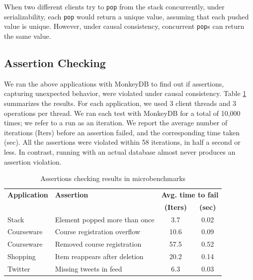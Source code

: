 When two different clients try to \texttt{pop} from the stack concurrently, 
under serializability, each \texttt{pop} would return a unique value, assuming that each pushed value is
unique. However, under causal consistency, concurrent \texttt{pop}s can return the same
value.

	

\subsection{Assertion Checking}
\label{sec:micro-assertion-violations}

We ran the above applications with MonkeyDB to find out if assertions, capturing
unexpected behavior, were violated under causal consistency. Table
\ref{tab:assert} summarizes the results. For each application, 
we used 3 client threads and 3 operations per thread. 
We ran each test with MonkeyDB for a total of 10,000 times; we refer to a run as
an iteration. We  report the average number of iterations (Iters) 
before an assertion failed, and the corresponding time taken 
(sec). All the assertions were violated within 58 iterations, in half a second
or less. In contrast, running with an actual database almost never
produces an assertion violation.

\begin{table}[]
	\footnotesize
	\begin{tabular}{|l|l|c|c|}
		
		\hline
		
    \textbf{Application} & \textbf{Assertion}   & \multicolumn{2}{c|}{\textbf{Avg. time to fail}}     \\ 
                         &                      & \textbf{(Iters)} & \textbf{(sec)} \\ \hline
		
    Stack                & Element popped more than once  & 3.7  & 0.02 \\ \hline
		
    Courseware           & Course registration overflow & 10.6 & 0.09  \\ \hline
		
    Courseware           & Removed course registration & 57.5 & 0.52   \\ \hline
		
    Shopping            & Item reappears after deletion & 20.2 & 0.14  \\ \hline
		
    Twitter              & Missing tweets in feed & 6.3 & 0.03 \\ \hline
		
	\end{tabular}
	\caption{\label{tab:assert}Assertions checking results in microbenchmarks}
\end{table}

